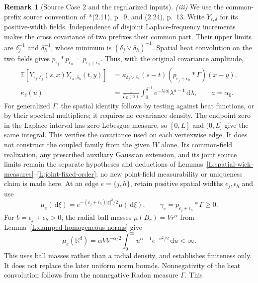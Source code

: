 \documentclass[12pt,oneside,openany]{book}
\numberwithin{equation}{section}
\theoremstyle{nogostyle}
\theoremstyle{definition}
\newtheorem{remark}[theorem]{Remark}
\newcommand{\R}{\mathbb{R}}
\newcommand{\E}{\mathbb{E}}
\newcommand{\ud}{\,\mathrm{d}}
\begin{document}
\begin{remark}[Source Case 2 and the regularized inputs]
  \emph{(iii)} We use the common-prefix source convention
  of~\cite{chen:author2026:time-dependency}*{(2.11), p.~9, and (2.24), p.~13}.
  Write $Y_{\epsilon,\delta}$ for its positive-width fields. Independence of
  disjoint Laplace-frequency increments makes the cross covariance of two
  prefixes their common part. Their upper limits are $\delta_j^{-1}$ and
  $\delta_h^{-1}$, whose minimum is $(\delta_j\vee\delta_h)^{-1}$. Spatial heat
  convolution on the two fields gives $p_{\epsilon_j}*p_{\epsilon_h} =
  p_{\epsilon_j+\epsilon_h}$. Thus, with the original covariance amplitude,
  \begin{equation}\label{E:pairing-source-covariance}
    \begin{split}
      \E[Y_{\epsilon_j,\delta_j}(s,x)
      Y_{\epsilon_h,\delta_h}(t,y)]
      &=\kappa_{\delta_j\vee\delta_h}(s-t)
      (p_{\epsilon_j+\epsilon_h}*\Gamma)(x-y),\\
      \kappa_\delta(u)&=\frac1{\Gamma_{\mathrm{E}}(a)}
      \int_0^{\delta^{-1}}e^{-\lambda|u|}\lambda^{a-1}\ud\lambda,
      \qquad a=\alpha_0.
    \end{split}
  \end{equation}
  For generalized $\Gamma$, the spatial identity follows by testing against heat
  functions, or by their spectral multipliers; it requires no covariance
  density. The endpoint zero in the Laplace interval has zero Lebesgue measure,
  so $[0,L]$ and $(0,L]$ give the same integral. This verifies the covariance
  used on each vertexwise edge. It does not construct the coupled family from
  the given $W$ alone. Its common-field realization, any prescribed auxiliary
  Gaussian extension, and its joint source limits remain the separate hypotheses
  and deductions of
  Lemmas~\ref{L:spatial-wick-measures}--\ref{L:joint-fixed-order}; no new
  point-field measurability or uniqueness claim is made here. At an edge $e =
  \{j,h\}$, retain positive spatial widths $\epsilon_j,\epsilon_h$ and use
  \[
    \mu_e(\ud\xi)=e^{-(\epsilon_j+\epsilon_h)|\xi|^2/2}\mu(\ud\xi),
    \qquad \gamma_e=p_{\epsilon_j+\epsilon_h}*\Gamma\ge0.
  \]
  For $b = \epsilon_j+\epsilon_h > 0$, the radial ball masses $\mu(B_r) =
  Vr^\alpha$ from Lemma~\ref{L:damped-homogeneous-norms} give
  \[
    \mu_e(\R^d)=\alpha Vb^{-\alpha/2}
    \int_0^\infty u^{\alpha-1}e^{-u^2/2}\ud u<\infty.
  \]
  This uses ball masses rather than a radial density, and establishes finiteness
  only. It does not replace the later uniform norm bounds. Nonnegativity of the
  heat convolution follows from the nonnegative Radon measure $\Gamma$. This

\end{remark}
\end{document}
